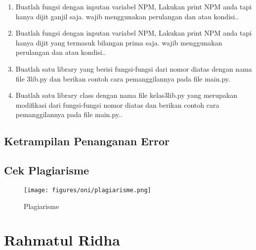 \begin{enumerate}
\item Buatlah fungsi dengan inputan variabel NPM, Lakukan print NPM anda tapi hanya dijit ganjil saja. wajib menggunakan perulangan dan atau kondisi..
    

\item Buatlah fungsi dengan inputan variabel NPM, Lakukan print NPM anda tapi hanya dijit yang termasuk bilangan prima saja. wajib menggunakan perulangan dan atau kondisi..
    

\item Buatlah satu library yang berisi fungsi-fungsi dari nomor diatas dengan nama file 3lib.py dan berikan contoh cara pemanggilannya pada file main.py.
    

\item Buatlah satu library class dengan nama file kelas3lib.py yang merupakan modifikasi dari fungsi-fungsi nomor diatas dan berikan contoh cara pemanggilannya pada file main.py..
    

\end{enumerate}
\subsection{Ketrampilan Penanganan Error}
   

\subsection{Cek Plagiarisme}
\begin{figure}[!htbp]
	\centering
	\texttt{[image: figures/oni/plagiarisme.png]}
	\caption{Plagiarisme}
	\label{plagiarisme}
\end{figure} 

\section{Rahmatul Ridha}
